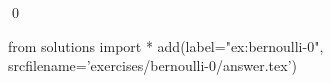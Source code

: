 
\begin{ex} 
  \label{ex:bernoulli-0}
  
  \qed
\end{ex} 
\begin{python0}
from solutions import *
add(label="ex:bernoulli-0",
    srcfilename='exercises/bernoulli-0/answer.tex') 
\end{python0}
